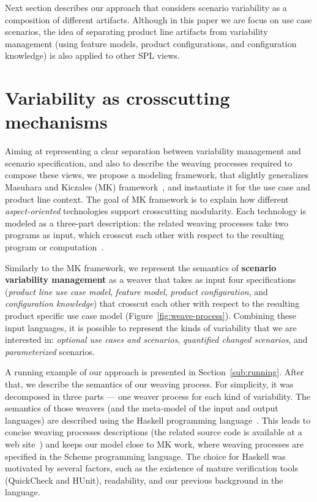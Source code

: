 \documentclass{acm_proc_article-sp}
\begin{document}
Next section describes our approach that considers scenario variability as a
composition of different artifacts. Although in this paper we are focus on use
case scenarios, the idea of separating product line artifacts from variability
management (using feature models, product configurations, and configuration
knowledge) is also applied to other SPL views.


\section{Variability as crosscutting mechanisms}
\label{sec:models}

Aiming at representing a clear separation between variability management and scenario specification, and also 
to describe the weaving processes required to compose these views, we propose a modeling framework, that slightly generalizes Masuhara and Kiczales (MK) framework~\cite{kiczales-ecoop-2003}, and instantiate it for the use case and product line context. The goal of MK framework is to
explain how different \emph{aspect-oriented} technologies support crosscutting modularity. Each technology is modeled 
as a three-part description: the related weaving processes take two programs as input, which crosscut each other with respect 
to the resulting program or computation~\cite{kiczales-ecoop-2003}. 

Similarly to the MK framework, we represent the semantics of \textbf{scenario variability management} as a weaver that takes as input four specifications
(\emph{product line use case model}, \emph{feature model}, \emph{product configuration}, and \emph{configuration knowledge}) that 
crosscut each other with respect to the resulting product specific use case model (Figure~\ref{fig:weave-process}). Combining these input languages, 
it is possible to represent the kinds of variability that we are interested in: \emph{optional use cases and scenarios}, \emph{quantified changed scenarios}, 
and \emph{parameterized} scenarios. 

A running example of our approach is presented in Section~\ref{sub:running}. After that, we describe the semantics of our weaving process. For 
simplicity, it was decomposed in three parts --- one weaver process for each kind of variability.  The semantics of those 
weavers (and the meta-model of the input and output languages) are described using the Haskell programming language~\cite{haskell-report}. 
This leads to concise weaving processes descriptions (the related source code is available at a web site~\cite{spg-url}) and keeps our model close to MK work, where weaving processes are specified in the Scheme programming language. The choice for Haskell was motivated by several factors, such as the existence of mature verification tools (QuickCheck and HUnit), readability, and our previous background in the language. 
 
\end{document}
